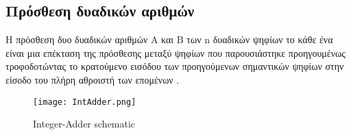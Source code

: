 % 
\subsection{Πρόσθεση δυαδικών αριθμών}

Η πρόσθεση δυο δυαδικών αριθμών A και Β των n δυαδικών ψηφίων το κάθε ένα είναι 
μια επέκταση της πρόσθεσης μεταξύ ψηφίων που παρουσιάστηκε προηγουμένως τροφοδοτώντας 
το κρατούμενο εισόδου των προηγούμενων σημαντικών ψηφίων στην είσοδο του πλήρη αθροιστή 
των επομένων .

\begin{figure}[H]
\centering
\texttt{[image: IntAdder.png]}
\caption{Integer-Adder schematic}
\label{IntegerAdderSchematic}
\end{figure}




